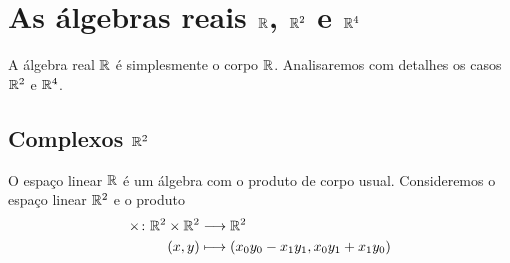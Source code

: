 \section{As álgebras reais $\mathbb{R}$, $\mathbb{R}^2$ e $\mathbb{R}^4$}

A álgebra real $\mathbb{R}$ é simplesmente o corpo $\mathbb{R}$. Analisaremos com detalhes os casos $\mathbb{R}^2$ e $\mathbb{R}^4$.

\subsection{Complexos $\mathbb{R}^2$}

O espaço linear $\mathbb{R}$ é um álgebra com o produto de corpo usual. Consideremos o espaço linear $\mathbb{R}^2$ e o produto
	\begin{align*}
	{\times}\colon {\mathbb{R}^2 \times \mathbb{R}^2} &\longrightarrow {\mathbb{R}^2} \\{(x,y)} &\longmapsto (x_0y_0-x_1y_1,x_0y_1+x_1y_0)
	\end{align*}

